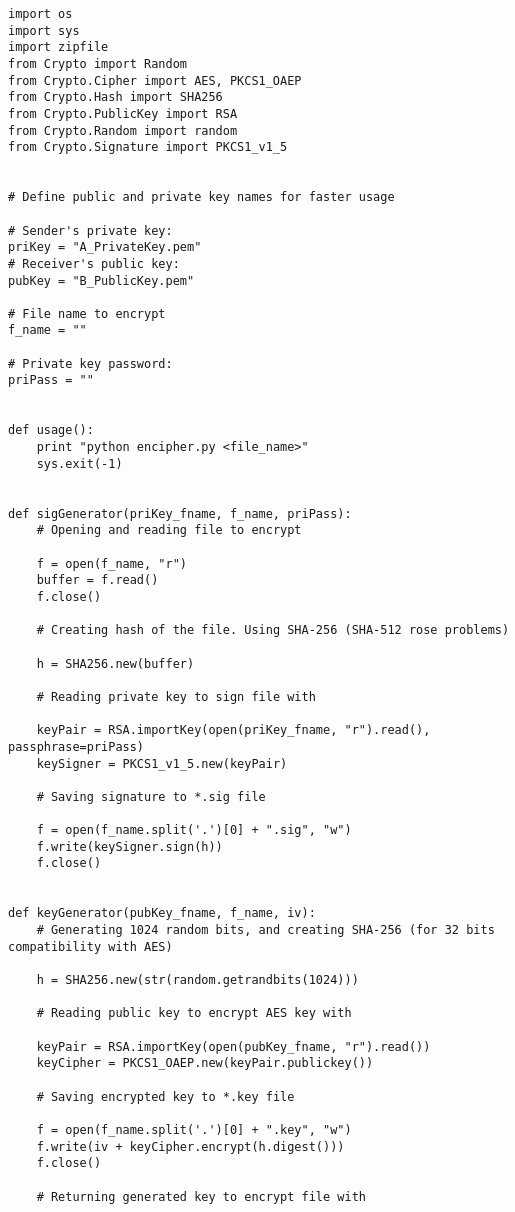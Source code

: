 \documentclass[a4paper,11pt,openright,oneside]{report}
\begin{document}
\begin{verbatim}
import os
import sys
import zipfile
from Crypto import Random
from Crypto.Cipher import AES, PKCS1_OAEP
from Crypto.Hash import SHA256
from Crypto.PublicKey import RSA
from Crypto.Random import random
from Crypto.Signature import PKCS1_v1_5


# Define public and private key names for faster usage

# Sender's private key:
priKey = "A_PrivateKey.pem"
# Receiver's public key:
pubKey = "B_PublicKey.pem"

# File name to encrypt
f_name = ""

# Private key password:
priPass = ""


def usage():
    print "python encipher.py <file_name>"
    sys.exit(-1)


def sigGenerator(priKey_fname, f_name, priPass):
    # Opening and reading file to encrypt

    f = open(f_name, "r")
    buffer = f.read()
    f.close()

    # Creating hash of the file. Using SHA-256 (SHA-512 rose problems)

    h = SHA256.new(buffer)

    # Reading private key to sign file with

    keyPair = RSA.importKey(open(priKey_fname, "r").read(), passphrase=priPass)
    keySigner = PKCS1_v1_5.new(keyPair)

    # Saving signature to *.sig file

    f = open(f_name.split('.')[0] + ".sig", "w")
    f.write(keySigner.sign(h))
    f.close()


def keyGenerator(pubKey_fname, f_name, iv):
    # Generating 1024 random bits, and creating SHA-256 (for 32 bits compatibility with AES)

    h = SHA256.new(str(random.getrandbits(1024)))

    # Reading public key to encrypt AES key with

    keyPair = RSA.importKey(open(pubKey_fname, "r").read())
    keyCipher = PKCS1_OAEP.new(keyPair.publickey())

    # Saving encrypted key to *.key file

    f = open(f_name.split('.')[0] + ".key", "w")
    f.write(iv + keyCipher.encrypt(h.digest()))
    f.close()

    # Returning generated key to encrypt file with


\end{verbatim}
\end{document}
